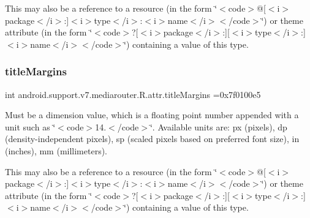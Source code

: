This may also be a reference to a resource (in the form \char`\"{}$<$code$>$@\mbox{[}$<$i$>$package$<$/i$>$\+:\mbox{]}$<$i$>$type$<$/i$>$\+:$<$i$>$name$<$/i$>$$<$/code$>$\char`\"{}) or theme attribute (in the form \char`\"{}$<$code$>$?\mbox{[}$<$i$>$package$<$/i$>$\+:\mbox{]}\mbox{[}$<$i$>$type$<$/i$>$\+:\mbox{]}$<$i$>$name$<$/i$>$$<$/code$>$\char`\"{}) containing a value of this type. \mbox{\label{classandroid_1_1support_1_1v7_1_1mediarouter_1_1R_1_1attr_a6c4fad1182a34cacceda1bb43c2edf65}} 
\subsubsection{\texorpdfstring{title\+Margins}{titleMargins}}
{\footnotesize\ttfamily int android.\+support.\+v7.\+mediarouter.\+R.\+attr.\+title\+Margins =0x7f0100e5\hspace{0.3cm}{\ttfamily [static]}}

Must be a dimension value, which is a floating point number appended with a unit such as \char`\"{}$<$code$>$14.\+5sp$<$/code$>$\char`\"{}. Available units are\+: px (pixels), dp (density-\/independent pixels), sp (scaled pixels based on preferred font size), in (inches), mm (millimeters). 

This may also be a reference to a resource (in the form \char`\"{}$<$code$>$@\mbox{[}$<$i$>$package$<$/i$>$\+:\mbox{]}$<$i$>$type$<$/i$>$\+:$<$i$>$name$<$/i$>$$<$/code$>$\char`\"{}) or theme attribute (in the form \char`\"{}$<$code$>$?\mbox{[}$<$i$>$package$<$/i$>$\+:\mbox{]}\mbox{[}$<$i$>$type$<$/i$>$\+:\mbox{]}$<$i$>$name$<$/i$>$$<$/code$>$\char`\"{}) containing a value of this type. \mbox{\label{classandroid_1_1support_1_1v7_1_1mediarouter_1_1R_1_1attr_a8a22c5883e8405e7b89aaf289111bafb}} 
